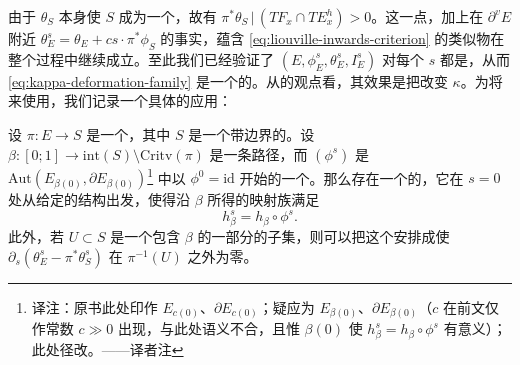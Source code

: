由于 $\theta_S$ 本身使 $S$ 成为一个\trExactSymplectic\trCorneredBoundary\trManifold，故有 $\pi^*\theta_S\,|\,(TF_x\cap TE^h_x)>0$。这一点，加上在 $\partial^v E$ 附近 $\theta^s_E=\theta_E+cs\cdot\pi^*\phi_S$ 的事实，蕴含 \eqref{eq:liouville-inwards-criterion} 的类似物在整个\trDeformation{}过程中继续成立。至此我们已经验证了 $(E,\phi^s_E,\theta^s_E,I^s_E)$ 对每个 $s$ 都是\trExactSymplectic\trCorneredBoundary\trManifold，从而 \eqref{eq:kappa-deformation-family} 是一个\trConstantAlongFibres{}的\trDeformation。从\trFiberBundle{}的观点看，其效果是把\trSymplectic\trConnection{}改变 $\kappa$。为将来使用，我们记录一个具体的应用：
\begin{lemma}\label{thm:transport-isotopy-realization}
设 $\pi\colon E\to S$ 是一个\trFibrationWithSingularities，其中 $S$ 是一个带边界的\trSurface。设 $\beta\colon[0;1]\to\mathrm{int}(S)\setminus\mathrm{Critv}(\pi)$ 是一条\trEmbedding{}路径，而 $(\phi^s)$ 是 $\mathrm{Aut}(E_{\beta(0)},\partial E_{\beta(0)})$\footnote{译注：原书此处印作 $E_{c(0)}$、$\partial E_{c(0)}$；疑应为 $E_{\beta(0)}$、$\partial E_{\beta(0)}$（$c$ 在前文仅作常数 $c\gg 0$ 出现，与此处语义不合，且惟 $\beta(0)$ 使 $h^s_\beta=h_\beta\circ\phi^s$ 有意义）；此处径改。——译者注} 中以 $\phi^0=\mathrm{id}$ 开始的一个\trIsotopy。那么存在一个\trConstantAlongFibres{}的\trDeformation，它在 $s=0$ 处从给定的\trFibration{}结构出发，使得沿 $\beta$ 所得的\trParallelTransport{}映射族满足
\begin{equation*}
h^s_\beta=h_\beta\circ\phi^s.
\end{equation*}
此外，若 $U\subset S$ 是一个包含 $\beta$ 的一部分的\trOpen{}子集，则可以把这个\trDeformation{}安排成使 $\partial_s(\theta^s_E-\pi^*\theta^s_S)$ 在 $\pi^{-1}(U)$ 之外为零。
\noqed
\end{lemma}
